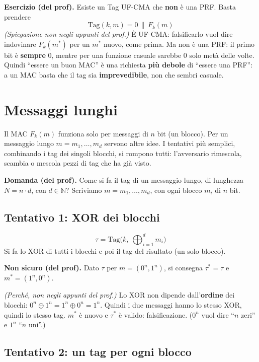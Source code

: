 \textbf{Esercizio (del prof).} Esiste un Tag UF-CMA che \textbf{non} è una PRF. Basta prendere
\[
\text{Tag}(k, m) = 0 \,\|\, F_k(m)
\]
\emph{(Spiegazione non negli appunti del prof.)} È UF-CMA: falsificarlo vuol dire indovinare \(F_k(m^*)\) per un \(m^*\) nuovo, come prima. Ma non è una PRF: il primo bit è \textbf{sempre} 0, mentre per una funzione casuale sarebbe 0 solo metà delle volte. Quindi ``essere un buon MAC'' è una richiesta \textbf{più debole} di ``essere una PRF'': a un MAC basta che il tag sia \textbf{imprevedibile}, non che sembri casuale.

\section{Messaggi lunghi}

\begin{inbreve}
Il MAC \(F_k(m)\) funziona solo per messaggi di \(n\) bit (un blocco). Per un messaggio lungo \(m = m_1, \dots, m_d\) servono altre idee. I tentativi più semplici, combinando i tag dei singoli blocchi, si rompono tutti: l'avversario rimescola, scambia o mescola pezzi di tag che ha già visto.
\end{inbreve}

\textbf{Domanda (del prof).} Come si fa il tag di un messaggio lungo, di lunghezza \(N = n \cdot d\), con \(d \in \mathbb{N}\)? Scriviamo \(m = m_1, \dots, m_d\), con ogni blocco \(m_i\) di \(n\) bit.

\subsection{Tentativo 1: XOR dei blocchi}

\[
\tau = \text{Tag}\Big(k,\ \bigoplus_{i=1}^{d} m_i\Big)
\]
Si fa lo XOR di tutti i blocchi e poi il tag del risultato (un solo blocco).

\textbf{Non sicuro (del prof).} Dato \(\tau\) per \(m = (0^n, 1^n)\), si consegna \(\tau^* = \tau\) e \(m^* = (1^n, 0^n)\).

\emph{(Perché, non negli appunti del prof.)} Lo XOR non dipende dall'\textbf{ordine} dei blocchi: \(0^n \oplus 1^n = 1^n \oplus 0^n = 1^n\). Quindi i due messaggi hanno lo stesso XOR, quindi lo stesso tag. \(m^*\) è nuovo e \(\tau^*\) è valido: falsificazione. (\(0^n\) vuol dire ``\(n\) zeri'' e \(1^n\) ``\(n\) uni''.)

\subsection{Tentativo 2: un tag per ogni blocco}

